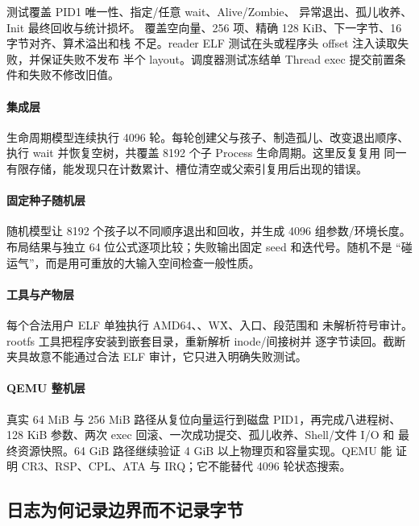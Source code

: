  测试覆盖 PID1 唯一性、指定/任意 wait、Alive/Zombie、
异常退出、孤儿收养、Init 最终回收与统计损坏。
覆盖空向量、256 项、精确 128 KiB、下一字节、16 字节对齐、算术溢出和栈
不足。reader ELF 测试在头或程序头 offset 注入读取失败，并保证失败不发布
半个 layout。调度器测试冻结单 Thread exec 提交前置条件和失败不修改旧值。

\paragraph{集成层}

生命周期模型连续执行 4096 轮。每轮创建父与孩子、制造孤儿、改变退出顺序、
执行 wait 并恢复空树，共覆盖 8192 个子 Process 生命周期。这里反复复用
同一有限存储，能发现只在计数累计、槽位清空或父索引复用后出现的错误。

\paragraph{固定种子随机层}

随机模型让 8192 个孩子以不同顺序退出和回收，并生成 4096 组参数/环境长度。
布局结果与独立 64 位公式逐项比较；失败输出固定 seed 和迭代号。随机不是
“碰运气”，而是用可重放的大输入空间检查一般性质。

\paragraph{工具与产物层}

每个合法用户 ELF 单独执行 AMD64、、W\^X、入口、段范围和
未解析符号审计。rootfs 工具把程序安装到嵌套目录，重新解析 inode/间接树并
逐字节读回。截断夹具故意不能通过合法 ELF 审计，它只进入明确失败测试。

\paragraph{QEMU 整机层}

真实 64 MiB 与 256 MiB 路径从复位向量运行到磁盘 PID1，再完成八进程树、
128 KiB 参数、两次 exec 回滚、一次成功提交、孤儿收养、Shell/文件 I/O 和
最终资源快照。64 GiB 路径继续验证 4 GiB 以上物理页和容量实现。QEMU 能
证明 CR3、RSP、CPL、ATA 与 IRQ；它不能替代 4096 轮状态搜索。

\subsection{日志为何记录边界而不记录字节}

